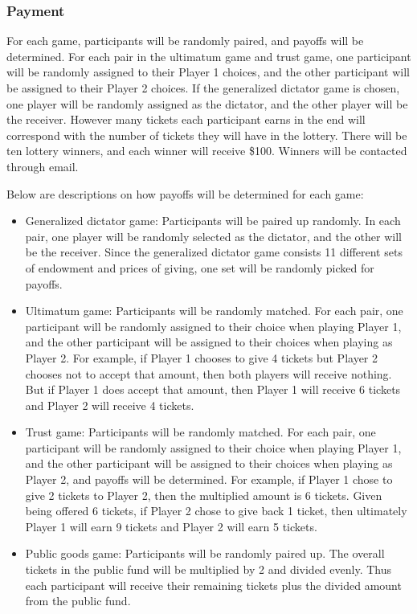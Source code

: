 \documentclass{article}
\begin{document}
\subsubsection{Payment}
For each game, participants will be randomly paired, and payoffs will be determined. For each pair in the ultimatum game and trust game, one participant will be randomly assigned to their Player 1 choices, and the other participant will be assigned to their Player 2 choices. If the generalized dictator game is chosen, one player will be randomly assigned as the dictator, and the other player will be the receiver. However many tickets each participant earns in the end will correspond with the number of tickets they will have in the lottery. There will be ten lottery winners, and each winner will receive \$100. Winners will be contacted through email. 

Below are descriptions on how payoffs will be determined for each game: 

\begin{itemize}

\item Generalized dictator game: Participants will be paired up randomly. In each pair, one player will be randomly selected as the dictator, and the other will be the receiver.  Since the generalized dictator game consists 11 different sets of endowment and prices of giving, one set will be randomly picked for payoffs.

\item Ultimatum game: Participants will be randomly matched. For each pair, one participant will be randomly assigned to their choice when playing Player 1, and the other participant will be assigned to their choices when playing as Player 2. For example, if Player 1 chooses to give 4 tickets but Player 2 chooses not to accept that amount, then both players will receive nothing. But if Player 1 does accept that amount, then Player 1 will receive 6 tickets and Player 2 will receive 4 tickets.

\item Trust game: Participants will be randomly matched. For each pair, one participant will be randomly assigned to their choice when playing Player 1, and the other participant will be assigned to their choices when playing as Player 2, and payoffs will be determined. For example, if Player 1 chose to give 2 tickets to Player 2, then the multiplied amount is 6 tickets. Given being offered 6 tickets, if Player 2 chose to give back 1 ticket, then ultimately Player 1 will earn 9 tickets and Player 2 will earn 5 tickets.

\item Public goods game: Participants will be randomly paired up. The overall tickets in the public fund will be multiplied by 2 and divided evenly. Thus each participant will receive their remaining tickets plus the divided amount from the public fund.

\end{itemize}
\end{document}
